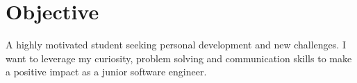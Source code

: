 \section{Objective}
A highly motivated student seeking personal development and new challenges. I want to leverage my curiosity, problem solving and communication skills to make a positive impact as a junior software engineer.

\vspace{1em}
